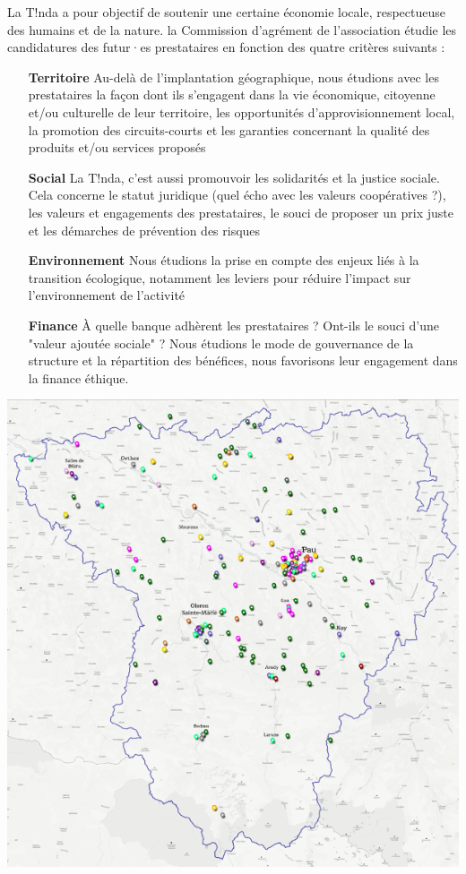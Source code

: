    \noindent La T!nda a pour objectif de soutenir une certaine économie locale, respectueuse des humains et de la nature. la Commission d'agrément de l'association étudie les candidatures des futur·es prestataires en fonction des quatre critères suivants :
    \begin{multicols}{2}
    \begin{itemize}
      \item[\textbf{Territoire}]  Au-delà de l'implantation géographique, nous étudions avec les prestataires la façon dont ils s'engagent dans la vie économique, citoyenne et/ou culturelle de leur territoire, les opportunités d'approvisionnement local, la promotion des circuits-courts et les garanties concernant la qualité des produits et/ou services proposés
	      \vspace{.3cm}
\item[\textbf{Social}] La T!nda, c'est aussi promouvoir les solidarités et la justice sociale. Cela concerne le statut juridique (quel écho avec les valeurs coopératives ?), les valeurs et engagements des prestataires, le souci de proposer un prix juste et les démarches de prévention des risques
    \vspace{.3cm}
\item[\textbf{Environnement}] Nous étudions la prise en compte des enjeux liés à la transition écologique, notamment les leviers pour réduire l'impact sur l'environnement de l'activité
	\vspace{.3cm}
\item[\textbf{Finance}] À quelle banque adhèrent les prestataires ? Ont-ils le souci d'une "valeur ajoutée sociale" ? Nous étudions le mode de gouvernance de la structure et la répartition des bénéfices, nous favorisons leur engagement dans la finance éthique.
    \end{itemize}

  \begin{center}
    \includegraphics[width=0.9\linewidth]{carte.png}
  \end{center}
\end{multicols}


